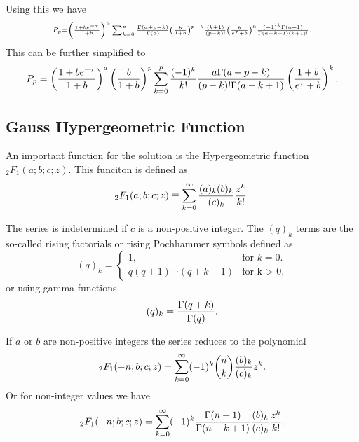 Using this we have
\begin{equation}
  \scriptstyle
  P_p = \left( {1 + b e^{-\tau} \over 1 + b} \right)^a
  \sum_{k=0}^p {\Gamma (a + p - k) \over \Gamma(a)}
  \left( {b \over 1 + b} \right)^{p - k}
  {(k + 1) \over (p - k)!} \left( b \over e^\tau + b \right)^k
  {(-1)^k \Gamma(a + 1) \over \Gamma(a - k + 1) (k + 1)!}.
\end{equation}
This can be further simplified to
\begin{equation}
  P_p = \left( {1 + b e^{-\tau} \over 1 + b} \right)^a
  \left( {b \over 1 + b} \right)^p
  \sum_{k=0}^p {(-1)^k \over k!}
  {a \Gamma(a + p - k) \over (p - k)! \Gamma(a - k + 1)}
  \left( {1 + b \over e^\tau + b} \right)^k.
  \label{eq_dist_nohyper}
\end{equation}

\subsection{Gauss Hypergeometric Function}

An important function for the solution is the Hypergeometric function
$_2F_1(a; b; c; z)$. This funciton is defined as
\begin{equation}
  _2F_1(a; b; c; z) \equiv \sum_{k=0}^\infty
  {(a)_k (b)_k \over (c)_k} {z^k \over k!}.
\end{equation}

The series is indetermined if $c$ is a non-positive integer. The $(q)_k$ terms
are the so-called rising factorials or rising Pochhammer symbols defined as
\begin{equation}
  (q)_k = \begin{cases}
  1, & \text{for }k = 0.\\
  q (q + 1)\cdots (q + k - 1) & \text{for k > 0},
  \end{cases}
\end{equation}
or using gamma functions
\begin{equation}
  (q)_k = {\Gamma (q + k) \over \Gamma (q)}.
\end{equation}

If $a$ or $b$ are non-positive integers the series reduces to the polynomial
\begin{equation}
_2F_1(-n; b; c; z) = \sum_{k=0}^\infty (-1)^k {n \choose k}
                    {(b)_k \over (c)_k} z^k.
\end{equation}
Or for non-integer values we have
\begin{equation}
_2F_1(-n; b; c; z) = \sum_{k=0}^\infty (-1)^k
                    {\Gamma (n + 1) \over \Gamma (n - k + 1)}
                    {(b)_k \over (c)_k} {z^k \over k!}.
\end{equation}

